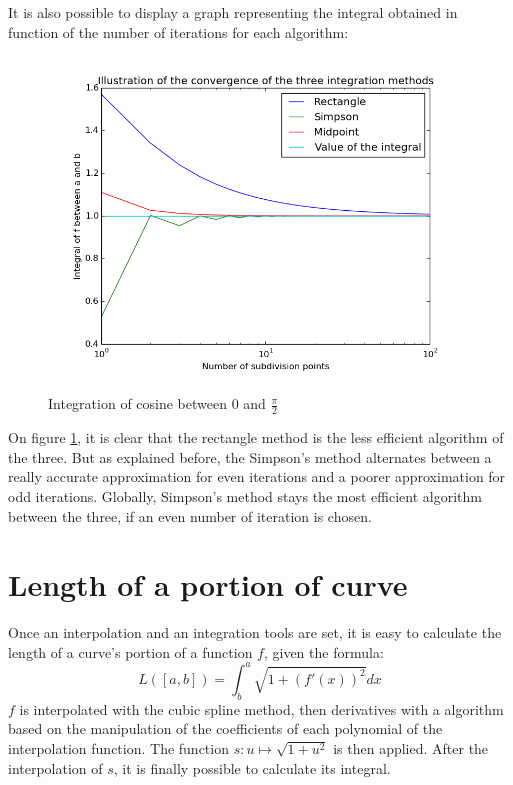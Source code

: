 \documentclass{article}
\begin{document}
It is also possible to display a graph representing the integral obtained in function of the number of iterations for each algorithm:

\begin{figure}[h]
  \centering
  \caption{Integration of cosine between $0$ and $\frac{\pi}{2}$}
  \includegraphics[width=12cm]{cosinus_integration}
  \label{cosinus_integration}
\end{figure}

On figure \ref{cosinus_integration}, it is clear that the rectangle method is the less efficient algorithm of the three. But as explained before, the Simpson's method alternates between a really accurate approximation for even iterations and a poorer approximation for odd iterations. Globally, Simpson's method stays the most efficient algorithm between the three, if an even number of iteration is chosen.

\section{Length of a portion of curve}

Once an interpolation and an integration tools are set, it is easy to calculate the length of a curve's portion of a function $f$, given the formula:
\begin{equation}
  L([a, b]) = \int^a_b{\sqrt{1 + (f'(x))^2} dx}
\end{equation} 
$f$ is interpolated with the cubic spline method, then derivatives with a algorithm based on the manipulation of the coefficients of each polynomial of the interpolation function. The function $s: u \mapsto \sqrt{1 + u^2}$ is then applied. After the interpolation of $s$, it is finally possible to calculate its integral.
\end{document}
